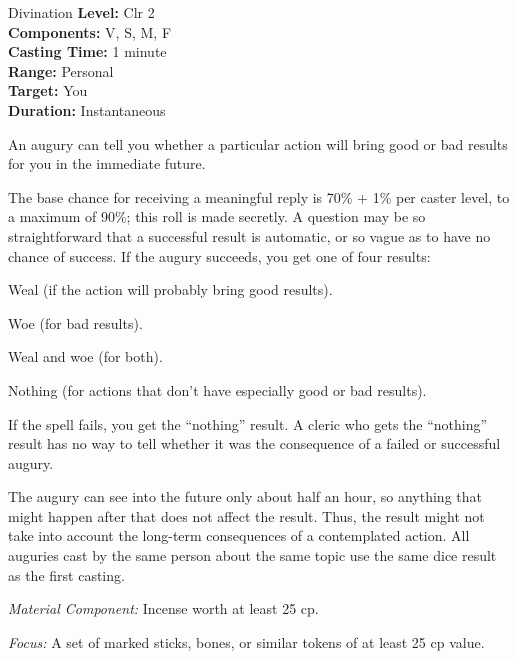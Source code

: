 {Divination}
{
	\textbf{Level:}
	Clr 2\\
	\textbf{Components:}
	V, S, M, F\\
	\textbf{Casting Time:}
	1 minute\\
	\textbf{Range:}
	Personal\\
	\textbf{Target:}
	You\\
	\textbf{Duration:}
	Instantaneous\\
}
{
	An augury can tell you whether a particular action will bring good or bad results for you in the immediate future.

	The base chance for receiving a meaningful reply is 70\% + 1\% per caster level, to a maximum of 90\%; this roll is made secretly. A question may be so straightforward that a successful result is automatic, or so vague as to have no chance of success. If the augury succeeds, you get one of four results:

\begin{itemize*}
\item Weal (if the action will probably bring good results).
\item Woe (for bad results).
\item Weal and woe (for both).
\item Nothing (for actions that don't have especially good or bad results).
\end{itemize*}

	If the spell fails, you get the ``nothing'' result. A cleric who gets the ``nothing'' result has no way to tell whether it was the consequence of a failed or successful augury.

	The augury can see into the future only about half an hour, so anything that might happen after that does not affect the result. Thus, the result might not take into account the long-term consequences of a contemplated action. All auguries cast by the same person about the same topic use the same dice result as the first casting.

	\textit{Material Component:}
	Incense worth at least 25 cp.

	\textit{Focus:}
	A set of marked sticks, bones, or similar tokens of at least 25 cp value.

}
